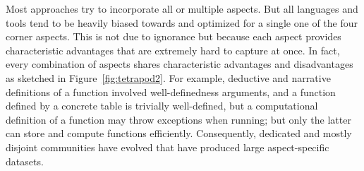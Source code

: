 Most approaches try to incorporate all or multiple aspects.
But all languages and tools tend to be heavily biased towards and optimized for a single one of the four corner aspects.
This is not due to ignorance but because each aspect provides characteristic advantages that are extremely hard to capture at once.
In fact, every combination of aspects shares characteristic advantages and disadvantages as sketched in Figure~\ref{fig:tetrapod2}.
For example, deductive and narrative definitions of a function involved well-definedness arguments, and a function defined by a concrete table is trivially well-defined, but a computational definition of a function may throw exceptions when running; but only the latter can store and compute functions efficiently.
Consequently, dedicated and mostly disjoint communities have evolved that have produced large aspect-specific datasets.

